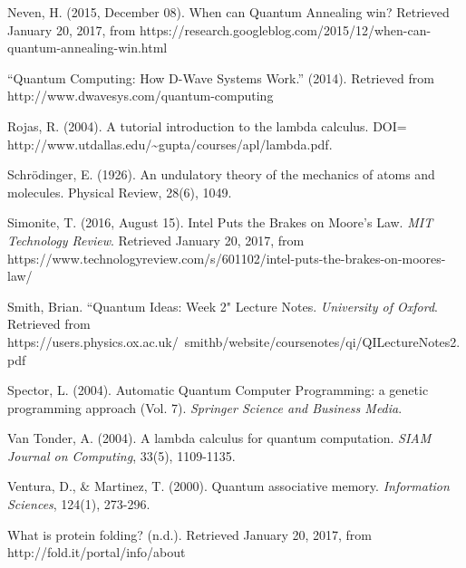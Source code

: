 \documentclass[11pt]{report}
\newcommand{\?}{\stackrel{?}{=}}
\begin{document}
\begin{thebibliography}{9}
  Neven, H. (2015, December 08). When can Quantum Annealing win? Retrieved January 20, 2017, from https://research.googleblog.com/2015/12/when-can-quantum-annealing-win.html  
  
  “Quantum Computing: How D-Wave Systems Work.” (2014). Retrieved from http://www.dwavesys.com/quantum-computing
  
  Rojas, R. (2004). A tutorial introduction to the lambda calculus. DOI= http://www.utdallas.edu/\textasciitilde gupta/courses/apl/lambda.pdf.  
  
  Schrödinger, E. (1926). An undulatory theory of the mechanics of atoms and molecules. Physical Review, 28(6), 1049.

  Simonite, T. (2016, August 15). Intel Puts the Brakes on Moore's Law. \emph{MIT Technology Review}. Retrieved January 20, 2017, from https://www.technologyreview.com/s/601102/intel-puts-the-brakes-on-moores-law/

   Smith, Brian. ``Quantum Ideas: Week 2" Lecture Notes. \emph{University of Oxford}. Retrieved from
   https://users.physics.ox.ac.uk/~smithb/website/coursenotes/qi/QILectureNotes2.pdf

  Spector, L. (2004). Automatic Quantum Computer Programming: a genetic programming approach (Vol. 7). \emph{Springer Science and Business Media}.

  Van Tonder, A. (2004). A lambda calculus for quantum computation. \emph{SIAM Journal on Computing}, 33(5), 1109-1135.

  Ventura, D., \& Martinez, T. (2000). Quantum associative memory. \emph{Information Sciences}, 124(1), 273-296.

  What is protein folding? (n.d.). Retrieved January 20, 2017, from http://fold.it/portal/info/about

\end{thebibliography}
\end{document}
